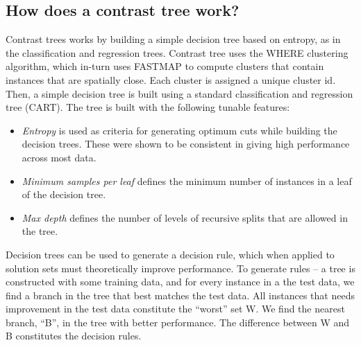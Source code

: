 \documentclass[conference]{IEEEtran}
\begin{document}
\subsection{How does a contrast tree work?}
Contrast trees works by building a simple decision tree based on entropy, as in the classification and regression trees. Contrast tree uses the WHERE clustering algorithm, which in-turn uses FASTMAP \cite{} to compute clusters 
that contain instances that are spatially close. Each cluster is assigned a unique cluster id. Then, a simple decision tree is built using a standard classification and regression tree (CART). The tree is built with the following tunable features:
\begin{itemize}
\item \textit{Entropy} is used as criteria for generating optimum cuts while building the decision trees. These were shown to be consistent in giving high performance across most data.
\item \textit{Minimum samples per leaf} defines the minimum number of instances in a leaf of the decision tree.
\item \textit{Max depth} defines the number of levels of recursive splits that are allowed in the tree.
\end{itemize}
Decision trees can be used to generate a decision rule, which when applied to solution sets must theoretically improve performance. To generate rules -- a tree is constructed with some training data, and for every instance in a the test data, we find a branch in the tree that best matches the test data. All instances that needs improvement in the test data constitute the ``worst'' set W. We find the nearest branch, ``B'', in the tree with better performance. The difference between W and B constitutes the decision rules.
\end{document}
